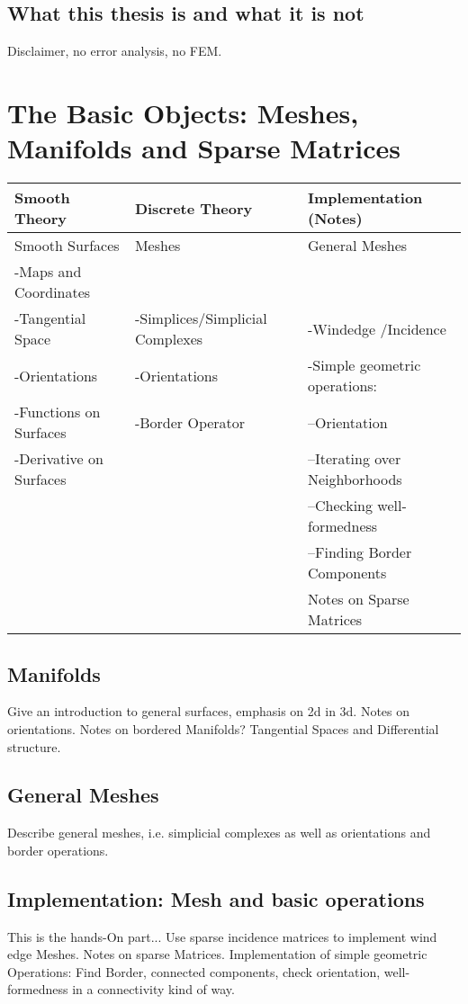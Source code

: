 \documentclass{scrartcl}
\begin{document}
	\subsection{What this thesis is and what it is not}
		Disclaimer, no error analysis, no FEM.
	
\newpage	
\section{The Basic Objects: Meshes, Manifolds and Sparse Matrices}
	\begin{tabular}{|l|l|l|}
		\hline
		Smooth Theory& Discrete Theory& Implementation (Notes)\\
		\hline
			Smooth Surfaces & Meshes & General Meshes\\
			-Maps and Coordinates & & \\
			-Tangential Space & -Simplices/Simplicial Complexes & -Windedge /Incidence\\
			-Orientations & -Orientations& -Simple geometric operations:\\
			-Functions on Surfaces & -Border Operator & --Orientation\\
			-Derivative on Surfaces & & --Iterating over Neighborhoods\\
			& & --Checking well-formedness \\
			& & --Finding Border Components\\
			& & Notes on Sparse Matrices\\
		\hline
	\end{tabular}
	\subsection{Manifolds}
		Give an introduction to general surfaces, emphasis on 2d in 3d.
		Notes on orientations. Notes on bordered Manifolds?
		Tangential Spaces and Differential structure.
	\subsection{General Meshes}
		Describe general meshes, i.e. simplicial complexes as well as orientations and border operations.
	\subsection{Implementation: Mesh and basic operations}
		This is the hands-On part...
		Use sparse incidence matrices to implement wind edge Meshes. Notes on sparse Matrices. Implementation of simple geometric Operations: Find Border, 
		connected components, check orientation, well-formedness in a connectivity kind of way. 
\newpage	
\end{document}
